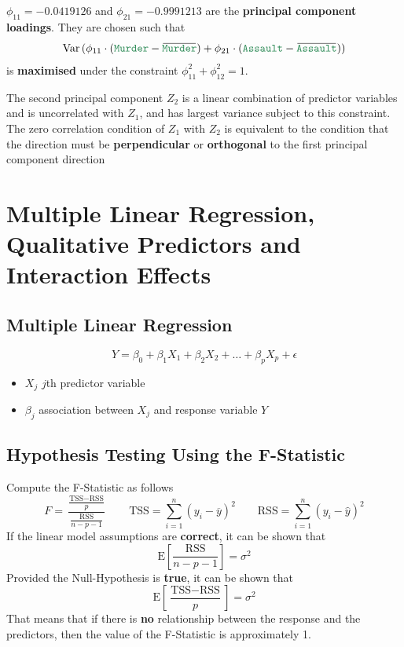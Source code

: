 \documentclass[11pt]{article}
\newcommand*\samplemean[1]{\overline{#1}}
\newcommand*\ev[1]{\mathrel{\text{E}\left[#1\right]}}
\newcommand*\Var[1]{\mathop{\text{Var}}\left(#1\right)}
\newcommand*\predvar[1]{{\color{SeaGreen4} \texttt{#1}}}
\newcommand{\overbar}[1]{\mkern 1.5mu\overline{\mkern-1.5mu#1\mkern-1.5mu}\mkern 1.5mu}
\begin{document}
$\phi_{11} = -0.0419126$ and $\phi_{21} = -0.9991213$ are the \textbf{principal component loadings}. They are chosen such that
\begin{equation*}
\Var{\phi_{11}\cdot(\text{\predvar{Murder}} - \overbar{\text{\predvar{Murder}}}) + \phi_{21}\cdot(\text{\predvar{Assault}} - \overbar{\text{\predvar{Assault}}})}
\end{equation*}
is \textbf{maximised} under the constraint $\phi_{11}^2 + \phi_{12}^2 = 1$.

The second principal component $Z_2$ is a linear combination of predictor variables and is uncorrelated with $Z_1$, and has largest variance subject to this constraint. The zero correlation condition of $Z_1$ with $Z_2$ is equivalent to the condition that the direction must be \textbf{perpendicular} or \textbf{orthogonal} to the first principal component direction


\section{Multiple Linear Regression, Qualitative Predictors and Interaction Effects}
\subsection{Multiple Linear Regression}
\begin{definition}
	\begin{equation*}
		Y = \beta_0 + \beta_1 X_1 + \beta_2 X_2 + \dots + \beta_p X_p + \epsilon
	\end{equation*}
	\begin{itemize}[label=]
		\item $X_j$ \quad $j$th predictor variable
		\item $\beta_j$ \quad association between $X_j$ and response variable $Y$
	\end{itemize}
\end{definition}

\subsection{Hypothesis Testing Using the F-Statistic}
Compute the F-Statistic as follows
\begin{equation*}
	F = \frac{\frac{\text{TSS} - \text{RSS}}{p}}{\frac{\text{RSS}}{n-p-1}} \qquad \text{TSS} = \sum_{i=1}^{n} (y_i - \samplemean{y})^2 \qquad \text{RSS} = \sum_{i=1}^{n} (y_i - \hat{y})^2
\end{equation*}
If the linear model assumptions are \textbf{correct}, it can be shown that
\begin{equation*}
	\ev{\frac{\text{RSS}}{n-p-1}} = \sigma^2
\end{equation*}
Provided the Null-Hypothesis is \textbf{true}, it can be shown that
\begin{equation*}
	\ev{\frac{\text{TSS}-\text{RSS}}{p}} = \sigma^2
\end{equation*}
That means that if there is \textbf{no} relationship between the response and the predictors, then the value of the F-Statistic is approximately 1.
\end{document}
